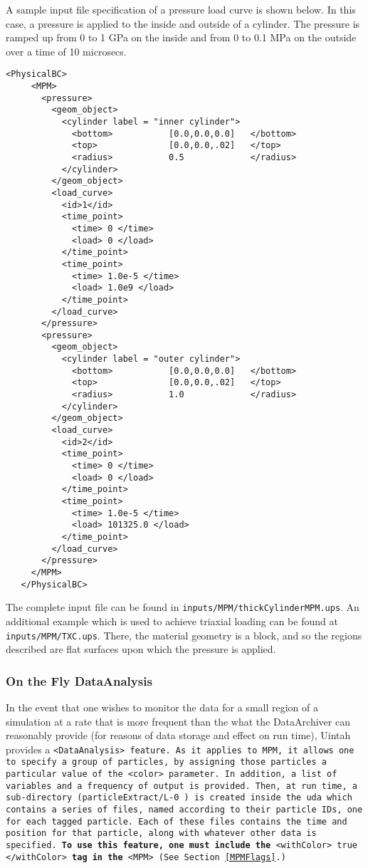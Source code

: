 A sample input file specification of a pressure load curve is shown below.
In this case, a pressure is applied to the inside and outside of a cylinder.
The pressure is ramped up from 0 to 1 GPa on the inside and from 0 to 0.1 MPa
on the outside over a time of 10 microsecs.
\begin{Verbatim}[fontsize=\footnotesize]
   <PhysicalBC>
     <MPM>
       <pressure>
         <geom_object>
           <cylinder label = "inner cylinder">
             <bottom>           [0.0,0.0,0.0]   </bottom>
             <top>              [0.0,0.0,.02]   </top>
             <radius>           0.5             </radius>
           </cylinder>
         </geom_object>
         <load_curve>
           <id>1</id>
           <time_point>
             <time> 0 </time>
             <load> 0 </load>
           </time_point>
           <time_point>
             <time> 1.0e-5 </time>
             <load> 1.0e9 </load>
           </time_point>
         </load_curve>
       </pressure>
       <pressure>
         <geom_object>
           <cylinder label = "outer cylinder">
             <bottom>           [0.0,0.0,0.0]   </bottom>
             <top>              [0.0,0.0,.02]   </top>
             <radius>           1.0             </radius>
           </cylinder>
         </geom_object>
         <load_curve>
           <id>2</id>
           <time_point>
             <time> 0 </time>
             <load> 0 </load>
           </time_point>
           <time_point>
             <time> 1.0e-5 </time>
             <load> 101325.0 </load>
           </time_point>
         </load_curve>
       </pressure>
     </MPM>
   </PhysicalBC>
\end{Verbatim}
The complete input file can be found in \verb|inputs/MPM/thickCylinderMPM.ups|. 
An additional example which is used to achieve triaxial loading can be found
at \verb|inputs/MPM/TXC.ups|.  There, the material geometry is a block, and so
the regions described are flat surfaces upon which the pressure is applied.

\subsubsection{On the Fly DataAnalysis} \label{OTFA_MPM}

In the event that one wishes to monitor the data for a small region of a
simulation at a rate that is more frequent than the what the DataArchiver
can reasonably provide (for reasons of data storage and effect on run time),
Uintah provides a \tt <DataAnalysis> \normalfont feature.  As it applies
to MPM, it allows one to specify a group of particles, by assigning those
particles a particular value of the \tt <color> \normalfont parameter.
In addition, a list of variables and a frequency of output is provided.
Then, at run time, a sub-directory (\tt particleExtract/L-0 \normalfont)
is created inside the uda which contains
a series of files, named according to their particle IDs, one for each
tagged particle.  Each of these files contains the time and position for
that particle, along with whatever other data is specified.  {\bf To use this
feature, one must include the} \tt <withColor>   true   </withColor> \normalfont
{\bf tag in the} \tt <MPM> 
(See Section~\ref{MPMFlags}.)

